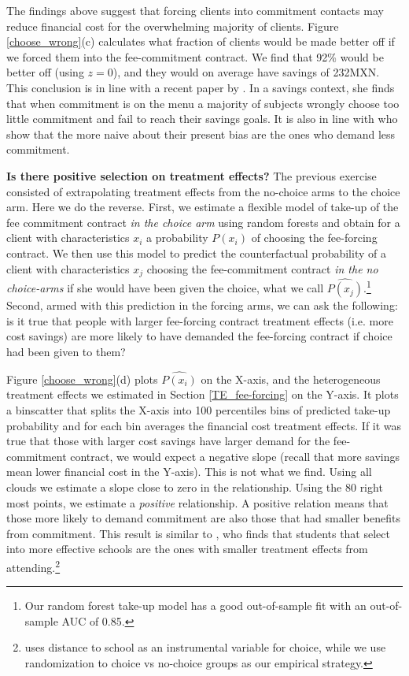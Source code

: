 \documentclass[oneside,11pt]{article}
\begin{document}
The findings above suggest that forcing clients into commitment contacts may reduce financial cost for the overwhelming majority of clients. Figure \ref{choose_wrong}(c) calculates what fraction of clients would be made better off if we forced them into the fee-commitment contract. We find that 92\% would be better off (using $z=0$), and they would on average have savings of 232MXN. This conclusion is in line with a recent paper by \cite{John}. In a savings context, she finds that when commitment is on the menu a majority of subjects wrongly choose too little commitment and fail to reach their savings goals. It is also in line with \cite{Sprenger} who show that the more naive about their present bias are the ones who demand less commitment.

    
\vspace{.2in}
\noindent \textbf{Is there positive selection on treatment effects?} The previous exercise consisted of extrapolating treatment effects from the no-choice arms to the choice arm. Here we do the reverse. First, we estimate a flexible model of take-up of the fee commitment contract \textit{in the choice arm} using random forests and obtain for a client with characteristics $x_i$ a probability $P(x_i)$ of choosing the fee-forcing contract. We then use this model to predict the counterfactual probability of a client with characteristics $x_j$ choosing the fee-commitment contract \textit{in the no choice-arms} if she would have been given the choice, what we call $\widehat{P(x_j)}$.\footnote{Our random forest take-up model has a good out-of-sample fit with an out-of-sample AUC of 0.85.} Second, armed with this prediction in the forcing arms, we can ask the following: is it true that people with larger fee-forcing contract treatment effects (i.e. more cost savings) are more likely to have demanded the fee-forcing contract if choice had been given to them? 

Figure \ref{choose_wrong}(d) plots $\widehat{P(x_i)}$ on the X-axis, and the heterogeneous treatment effects we estimated in Section \ref{TE_fee-forcing} on the Y-axis. It plots a binscatter that splits the X-axis into 100 percentiles bins of predicted take-up probability and for each bin averages the financial cost treatment effects. If it was true that those with larger cost savings have larger demand for the fee-commitment contract, we would expect a negative slope (recall that more savings mean lower financial cost in the Y-axis). This is not what we find.  Using all clouds we estimate a slope close to zero in the relationship. Using the 80 right most points, we estimate a \textit{positive} relationship. A positive relation means that those more likely to demand commitment are also those that had smaller benefits from commitment. This result is similar to \cite{Walters}, who finds that students that select into more effective schools are the ones with smaller treatment effects from attending.\footnote{\cite{Walters} uses distance to school as an instrumental variable for choice, while we use randomization to choice vs no-choice groups as our empirical strategy.}
\end{document}
